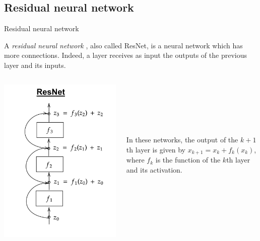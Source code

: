 \documentclass[11pt]{beamer}
\begin{document}
\subsection{Residual neural network} \label{rnn}
\begin{frame}{Residual neural network}

A\textit{ residual neural network} \cite{6}, also called ResNet, is a neural network which has more connections. Indeed, a layer receives as input the outputs of the previous layer and its inputs.

 \begin{columns}[t]
  \begin{column}{5cm}
\begin{center}
\includegraphics[scale=0.14]{resnet.png}
\end{center}
  \end{column}
  
  \begin{column}{5cm}
  \begin{center}
  ~
  
  ~
  
  ~
  
  
  In these networks, the output of the $k+1$th layer is given by
$
x_{k+1} = x_k + f_k(x_k)
$,
where $f_k$ is the function of the $k$th layer and its activation. 
  \end{center}

  \end{column}
 \end{columns} 
\end{frame}
\end{document}
